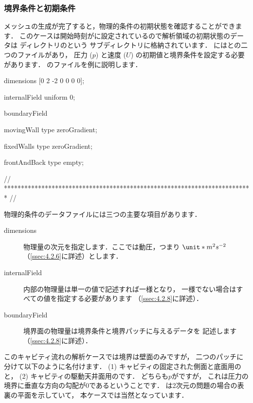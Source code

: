 \subsubsection{境界条件と初期条件}
\label{sssec:2.1.1.2}
メッシュの生成が完了すると，物理的条件の初期状態を確認することができます．
このケースは開始時刻がに設定されているので解析領域の初期状態のデータは
ディレクトリのという
サブディレクトリに格納されています．
にはとの二つのファイルがあり，
圧力 ($p$) と速度 ($U$) の初期値と境界条件を設定する必要があります．
のファイルを例に説明します．
\begin{OFverbatim}[file, linenum=17]
dimensions      [0 2 -2 0 0 0 0];

internalField   uniform 0;

boundaryField
{
    movingWall
    {
        type            zeroGradient;
    }

    fixedWalls
    {
        type            zeroGradient;
    }

    frontAndBack
    {
        type            empty;
    }
}

// ************************************************************************* //
\end{OFverbatim}
物理的条件のデータファイルには三つの主要な項目があります．
\begin{description}
 \item[dimensions]
%
%
            物理量の次元を指定します．ここでは動圧，つまり
            $\unit*{m^{2}s^{-2}}$（\autoref{ssec:4.2.6}に詳述）とします．
 \item[internalField]
%
%
            内部の物理量は単一の値で記述すれば一様となり，
            一様でない場合はすべての値を指定する必要があります
            （\autoref{ssec:4.2.8}に詳述）．
 \item[boundaryField]
%
%
            境界面の物理量は境界条件と境界パッチに与えるデータを
            記述します（\autoref{ssec:4.2.8}に詳述）．
\end{description}
このキャビティ流れの解析ケースでは境界は壁面のみですが，
二つのパッチに分けて以下のように名付けます．
(1) キャビティの固定された側面と底面用のと，
(2) キャビティの駆動天井面用のです．
どちらも$p$がですが，
これは圧力の境界に垂直な方向の勾配が$0$であるということです．
は2次元の問題の場合の表裏の平面を示していて，
本ケースでは当然となっています．

